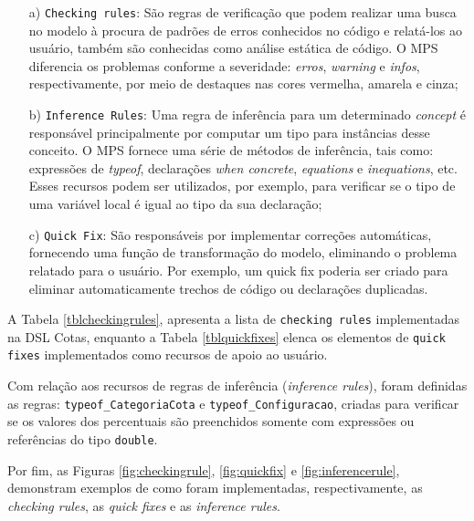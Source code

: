 \begin{enumerate}
 
 \item[a)] \texttt{Checking rules}: São regras de verificação que podem realizar uma busca no modelo à procura de padrões de erros conhecidos no código e relatá-los ao usuário, também são conhecidas como análise estática de código. O \gls{MPS} diferencia os problemas conforme a severidade: \textit{erros}, \textit{warning} e \textit{infos}, respectivamente, por meio de destaques nas cores vermelha, amarela e cinza;
 
 \item[b)]\texttt{Inference Rules}: Uma regra de inferência para um determinado \textit{concept} é responsável principalmente por computar um tipo para instâncias desse conceito. O \gls{MPS} fornece uma série de métodos de inferência, tais como: expressões de \textit{typeof}, declarações \textit{when concrete}, \textit{equations} e \textit{inequations}, etc. Esses recursos podem ser utilizados, por exemplo, para verificar se o tipo de uma variável local é igual ao tipo da sua declaração;
 
 \item[c)]\texttt{Quick Fix}: São responsáveis por implementar correções automáticas, fornecendo uma função de transformação do modelo, eliminando o problema relatado para o usuário. Por exemplo, um quick fix poderia ser criado para eliminar automaticamente trechos de código ou declarações duplicadas.
\end{enumerate}


A Tabela \ref{tblcheckingrules}, apresenta a lista de \texttt{checking rules} implementadas na DSL Cotas, enquanto a Tabela \ref{tblquickfixes} elenca os elementos de \texttt{quick fixes} implementados como recursos de apoio ao usuário.

\newpage

\newpage



Com relação aos recursos de regras de inferência (\textit{inference rules}), foram definidas as regras: \texttt{typeof\_CategoriaCota} e \texttt{typeof\_Configuracao}, criadas para verificar se os valores dos percentuais são preenchidos somente com expressões ou referências do tipo \texttt{double}.

Por fim, as Figuras \ref{fig:checkingrule}, \ref{fig:quickfix} e \ref{fig:inferencerule}, demonstram exemplos de como foram implementadas, respectivamente, as \textit{checking rules}, as \textit{quick fixes} e as \textit{inference rules}. 
